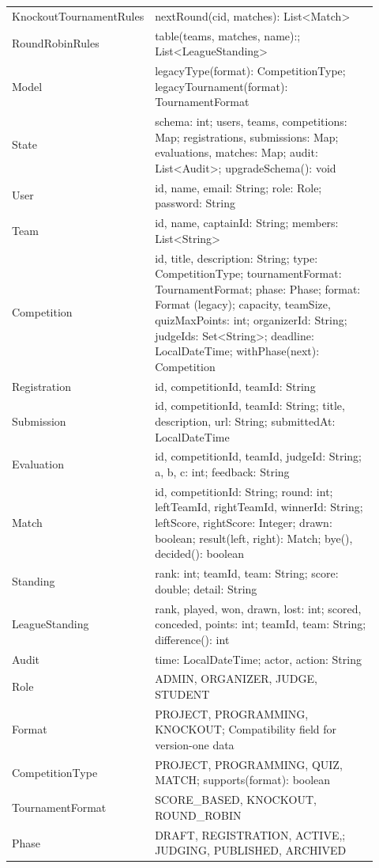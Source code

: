 \documentclass[12pt]{article}
\begin{document}
\begin{longtable}{p{0.28\linewidth}p{0.64\linewidth}}
Knockout\allowbreak TournamentRules & nextRound(cid, matches): List<Match>\\
RoundRobinRules & table(teams, matches, name):;     List<LeagueStanding>\\
Model & legacyType(format): CompetitionType; legacyTournament(format): TournamentFormat\\
State & schema: int; users, teams, competitions: Map; registrations, submissions: Map; evaluations, matches: Map; audit: List<Audit>; upgradeSchema(): void\\
User & id, name, email: String; role: Role; password: String\\
Team & id, name, captainId: String; members: List<String>\\
Competition & id, title, description: String; type: CompetitionType; tournamentFormat: TournamentFormat; phase: Phase; format: Format (legacy); capacity, teamSize, quizMaxPoints: int; organizerId: String; judgeIds: Set<String>; deadline: LocalDateTime; withPhase(next): Competition\\
Registration & id, competitionId, teamId: String\\
Submission & id, competitionId, teamId: String; title, description, url: String; submittedAt: LocalDateTime\\
Evaluation & id, competitionId, teamId, judgeId: String; a, b, c: int; feedback: String\\
Match & id, competitionId: String; round: int; leftTeamId, rightTeamId, winnerId: String; leftScore, rightScore: Integer; drawn: boolean; result(left, right): Match; bye(), decided(): boolean\\
Standing & rank: int; teamId, team: String; score: double; detail: String\\
LeagueStanding & rank, played, won, drawn, lost: int; scored, conceded, points: int; teamId, team: String; difference(): int\\
Audit & time: LocalDateTime; actor, action: String\\
Role & ADMIN, ORGANIZER, JUDGE, STUDENT\\
Format & PROJECT, PROGRAMMING, KNOCKOUT; Compatibility field for version-one data\\
CompetitionType & PROJECT, PROGRAMMING, QUIZ, MATCH; supports(format): boolean\\
TournamentFormat & SCORE\_BASED, KNOCKOUT, ROUND\_ROBIN\\
Phase & DRAFT, REGISTRATION, ACTIVE,; JUDGING, PUBLISHED, ARCHIVED\\\bottomrule\end{longtable}\normalsize
\end{document}
